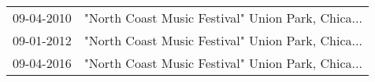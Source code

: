 \begin{supertabular}{ll}
 09-04-2010 &  "North Coast Music Festival" Union Park, Chica... \\
 09-01-2012 &  "North Coast Music Festival" Union Park, Chica... \\
 09-04-2016 &  "North Coast Music Festival" Union Park, Chica... \\
\end{supertabular}
